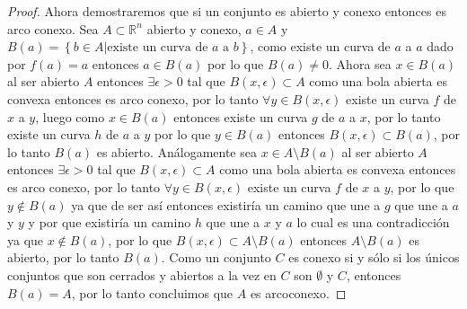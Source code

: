 \documentclass[letterpaper]{article}
\theoremstyle{definition}
\theoremstyle{lemathm}
\theoremstyle{lemathm}
\theoremstyle{lemathm}
\theoremstyle{lemademthm}
\newcommand{\pars}[1]{\left( #1 \right) }
\newcommand{\set}[1]{\left \{ #1 \right\} }
\newcommand{\RR}{\mathbb{R}}
\newcommand{\1}{\mathbbm{1}}
\begin{document}
\begin{enumerate}
\begin{proof}
			Ahora demostraremos que si un conjunto es abierto y conexo entonces es arco conexo. Sea $A\subset \RR^n$ abierto y conexo, $a\in A$ y $B\pars{a} = \set{b \in A | \text{existe un curva de $a$ a $b$}}$, como existe un curva de $a$ a $a$ dado por $f(a) = a$ entonces $a \in B\pars{a}$ por lo que $B\pars{a}\neq 0$. Ahora sea $x \in B\pars{a}$ al ser abierto $A$ entonces $\exists \epsilon > 0$ tal que $B\pars{x,\epsilon}\subset A$ como una bola abierta es convexa entonces es arco conexo, por lo tanto $\forall y\in B\pars{x,\epsilon}$ existe un curva $f$ de $x$ a $y$, luego como $x\in B\pars{a}$ entonces existe un curva $g$ de $a$ a $x$, por lo tanto existe un curva $h$ de $a$ a $y$ por lo que $y \in B\pars{a}$ entonces $B\pars{x,\epsilon} \subset B\pars{a}$, por lo tanto $B\pars{a}$ es abierto. Análogamente sea $x\in A\setminus B\pars{a}$ al ser abierto $A$ entonces $\exists \epsilon > 0$ tal que $B\pars{x,\epsilon}\subset A$ como una bola abierta es convexa entonces es arco conexo, por lo tanto $\forall y\in B\pars{x,\epsilon}$ existe un curva $f$ de $x$ a $y$, por lo que $y\not\in B\pars{a}$ ya que de ser así entonces existiría un camino que une a $g$ que une a $a$ y $y$ y por que existiría un camino $h$ que une a $x$ y $a$ lo cual es una contradicción ya que $x\not\in B\pars{a}$, por lo que $B\pars{x,\epsilon} \subset A\setminus B\pars{a}$ entonces $A\setminus B\pars{a}$ es abierto, por lo tanto $B\pars{a}$. Como un conjunto $C$ es conexo si y sólo si los únicos conjuntos que son cerrados y abiertos a la vez en $C$ son $\emptyset$ y $C$, entonces $B\pars{a} = A$, por lo tanto concluimos que $A$ es arcoconexo.
		\end{proof}

	\end{enumerate}
\end{document}
